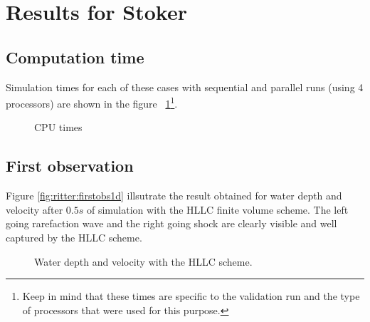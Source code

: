 \section{Results for Stoker}

\subsection{Computation time}

Simulation times for each of these cases with sequential and parallel runs (using 4 processors) are shown in the figure ~\ref{fig:stoker:cputime}\footnote{Keep in mind that these times
are specific to the validation run and the type of processors that were used for this purpose.}.

\begin{figure}[h!]
  \centering
  \caption{CPU times}\label{fig:stoker:cputime}
\end{figure}

\subsection{First observation}

Figure \ref{fig:ritter:firstobs1d} illsutrate the result obtained for water depth and velocity after $0.5s$ of
simulation with the HLLC finite volume scheme. The left going rarefaction wave and the right going shock are 
clearly visible and well captured by the HLLC scheme.

\begin{figure}[H]
\begin{minipage}[t]{0.5\textwidth}
 \centering
\end{minipage}%
\begin{minipage}[t]{0.5\textwidth}
 \centering
\end{minipage}
  \caption{Water depth and velocity with the HLLC scheme.}
  \label{fig:stoker:firstobs1d}
\end{figure}

%


